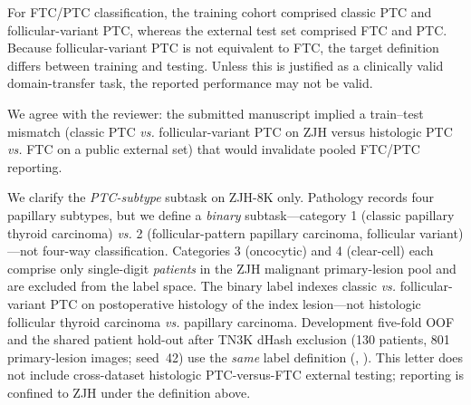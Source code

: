 \begin{reviewercomment}
For FTC/PTC classification, the training cohort comprised classic PTC and follicular-variant PTC, whereas the external test set comprised FTC and PTC. Because follicular-variant PTC is not equivalent to FTC, the target definition differs between training and testing. Unless this is justified as a clinically valid domain-transfer task, the reported performance may not be valid.
\end{reviewercomment}
\begin{authorresponse}
We agree with the reviewer: the submitted manuscript implied a train--test mismatch (classic PTC \emph{vs.} follicular-variant PTC on ZJH versus histologic PTC \emph{vs.} FTC on a public external set) that would invalidate pooled FTC/PTC reporting.\par
We clarify the \emph{PTC-subtype} subtask on ZJH-8K only. Pathology records four papillary subtypes, but we define a \emph{binary} subtask---category 1 (classic papillary thyroid carcinoma) \emph{vs.} 2 (follicular-pattern papillary carcinoma, follicular variant)---not four-way classification. Categories 3 (oncocytic) and 4 (clear-cell) each comprise only single-digit \emph{patients} in the ZJH malignant primary-lesion pool and are excluded from the label space. The binary label indexes classic \emph{vs.} follicular-variant PTC on postoperative histology of the index lesion---not histologic follicular thyroid carcinoma \emph{vs.} papillary carcinoma. Development five-fold OOF and the shared patient hold-out after TN3K dHash exclusion (130 patients, 801 primary-lesion images; seed~42) use the \emph{same} label definition (, ). This letter does not include cross-dataset histologic PTC-versus-FTC external testing; reporting is confined to ZJH under the definition above.\par
\par
\end{authorresponse}

